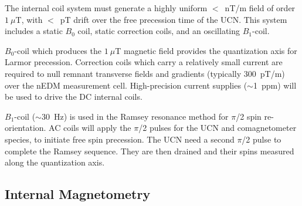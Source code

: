 The internal coil system must generate a highly uniform $<$~nT/m field of order $1~\mu$T, with $<$~pT drift over the free precession time of the UCN. This system includes a static $B_0$ coil, static correction coils, and an oscillating $B_1$-coil.




$B_0$-coil which produces the $1~\mu$T magnetic field provides the quantization axis for Larmor precession. Correction coils which carry a relatively small current are required to null remnant transverse fields and gradients (typically $300$~pT/m) over the nEDM measurement cell. High-precision current supplies ($\sim$1~ppm) will be used to drive the DC internal coils. 






$B_1$-coil ($\sim$30~Hz) is used in the Ramsey resonance method for $\pi$/2 spin re-orientation. AC coils will apply the $\pi$/2 pulses for the UCN and comagnetometer species, to initiate free spin precession. The UCN need a second $\pi$/2 pulse to complete the Ramsey sequence. They are then drained and their spins measured along the quantization axis.

\subsection{Internal Magnetometry}


